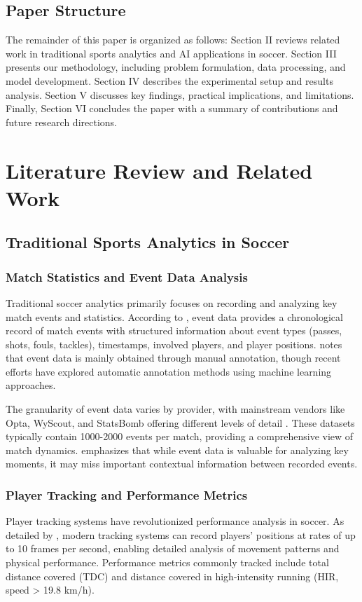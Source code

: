 \documentclass[10pt,journal,compsoc]{IEEEtran}
\begin{document}
\subsection{Paper Structure}
The remainder of this paper is organized as follows:
Section II reviews related work in traditional sports analytics and AI applications in soccer. Section III presents our methodology, including problem formulation, data processing, and model development. Section IV describes the experimental setup and results analysis. Section V discusses key findings, practical implications, and limitations. Finally, Section VI concludes the paper with a summary of contributions and future research directions.

\section{Literature Review and Related Work}

\subsection{Traditional Sports Analytics in Soccer}

\subsubsection{Match Statistics and Event Data Analysis}
Traditional soccer analytics primarily focuses on recording and analyzing key match events and statistics. According to \cite{rico2023machine}, event data provides a chronological record of match events with structured information about event types (passes, shots, fouls, tackles), timestamps, involved players, and player positions. \cite{pu2024orientation} notes that event data is mainly obtained through manual annotation, though recent efforts have explored automatic annotation methods using machine learning approaches.

The granularity of event data varies by provider, with mainstream vendors like Opta, WyScout, and StatsBomb offering different levels of detail \cite{rico2023machine}. These datasets typically contain 1000-2000 events per match, providing a comprehensive view of match dynamics. \cite{wong2025predictive} emphasizes that while event data is valuable for analyzing key moments, it may miss important contextual information between recorded events.

\subsubsection{Player Tracking and Performance Metrics}
Player tracking systems have revolutionized performance analysis in soccer. As detailed by \cite{konefal2023seven}, modern tracking systems can record players' positions at rates of up to 10 frames per second, enabling detailed analysis of movement patterns and physical performance. Performance metrics commonly tracked include total distance covered (TDC) and distance covered in high-intensity running (HIR, speed > 19.8 km/h).
\end{document}
